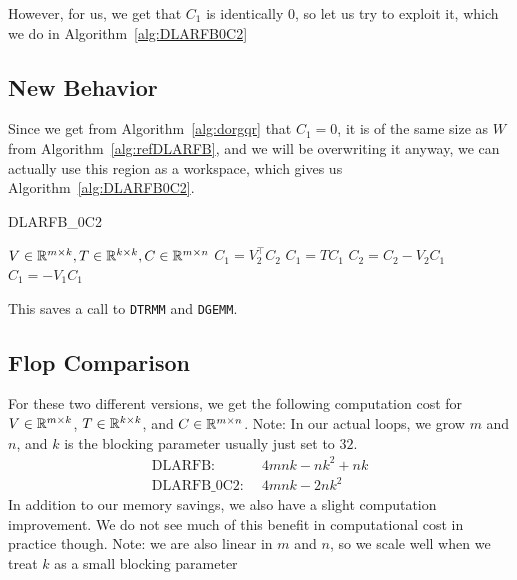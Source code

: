 \documentclass[12pt]{article}
\begin{document}
        However, for us, we get that $C_1$ is identically $0$, so let us try to exploit it, which we do in 
        Algorithm~\ref{alg:DLARFB0C2}
    \subsection{New Behavior}
    Since we get from Algorithm~\ref{alg:dorgqr} that $C_1 = 0$, it is of the same size as $W$ from 
    Algorithm~\ref{alg:refDLARFB}, and we will be overwriting it anyway, we can actually use this 
    region as a workspace, which gives us Algorithm~\ref{alg:DLARFB0C2}.
    \begin{algorithm}
        \caption{DLARFB\_0C2}\label{alg:DLARFB0C2}
        \begin{algorithmic}[1]
            \REQUIRE $V\in\mathbb{R}^{m\times k}, T\in\mathbb{R}^{k\times k}, C\in\mathbb{R}^{m\times n}$
            \STATE $C_1 = V_2^\top C_2$
            \STATE $C_1 = TC_1$
            \STATE $C_2 = C_2 - V_2C_1$
            \STATE $C_1 =     - V_1C_1$
        \end{algorithmic}
    \end{algorithm}
    This saves a call to \verb|DTRMM| and \verb|DGEMM|.
    \subsection{Flop Comparison}
        For these two different versions, we get the following computation cost for $V\in\mathbb{R}^{m\times k}$, $T\in\mathbb{R}^{k\times k}$, and $C\in\mathbb{R}^{m\times n}$.
Note: In our actual loops, we grow $m$ and $n$, and $k$ is the blocking parameter usually just set to $32$.%
        \begin{align*}
            \text{DLARFB: }&\, 4mnk - nk^2 + nk\\
            \text{DLARFB\_0C2: }&\, 4mnk - 2nk^2
        \end{align*}
        In addition to our memory savings, we also have a slight computation improvement. We do not see
        much of this benefit in computational cost in practice though. Note: we are also linear in $m$ and
        $n$, so we scale well when we treat $k$ as a small blocking parameter
\end{document}
